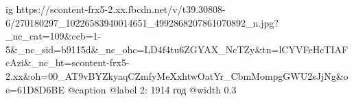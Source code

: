  
 
 
 
 

\ifcmt
  ig https://scontent-frx5-2.xx.fbcdn.net/v/t39.30808-6/270180297_10226583940014651_4992868207861070892_n.jpg?_nc_cat=109&ccb=1-5&_nc_sid=b9115d&_nc_ohc=LD4f4tu6ZGYAX_NcTZy&tn=lCYVFeHcTIAFcAzi&_nc_ht=scontent-frx5-2.xx&oh=00_AT9vBYZkyaqCZmfyMeXxhtwOatYr_CbmMompgGWU2sJjNg&oe=61D8D6BE
  @caption @label 2: 1914 год
  @width 0.3
\fi
